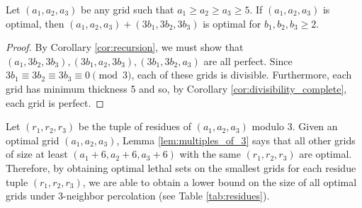 
\begin{lem}
\label{lem:multiples_of_3}
Let $(a_1,a_2,a_3)$ be any grid such that $a_1 \geq a_2 \geq a_3 \geq 5$. If $(a_1,a_2,a_3)$ is optimal, then $(a_1,a_2,a_3) + (3b_1,3b_2,3b_3)$ is optimal for $b_1,b_2,b_3 \geq 2$. 
\end{lem}

\begin{proof}
By Corollary \ref{cor:recursion}, we must show that $(a_1,3b_2,3b_3), (3b_1,a_2,3b_3), (3b_1,3b_2,a_3)$ are all perfect. Since $3b_1 \equiv 3b_2 \equiv 3b_3 \equiv 0 \pmod 3$, each of these grids is divisible. Furthermore, each grid has minimum thickness 5 and so, by Corollary \ref{cor:divisibility_complete}, each grid is perfect.
\end{proof}

Let $(r_1,r_2,r_3)$ be the tuple of residues of $(a_1,a_2,a_3)$ modulo 3. Given an optimal grid $(a_1,a_2,a_3)$, Lemma \ref{lem:multiples_of_3} says that all other grids of size at least $(a_1+6,a_2+6,a_3+6)$ with the same $(r_1,r_2,r_3)$ are optimal. Therefore, by obtaining optimal lethal sets on the smallest grids for each residue tuple $(r_1,r_2,r_3)$, we are able to obtain a lower bound on the size of all optimal grids under 3-neighbor percolation (see Table \ref{tab:residues}).

